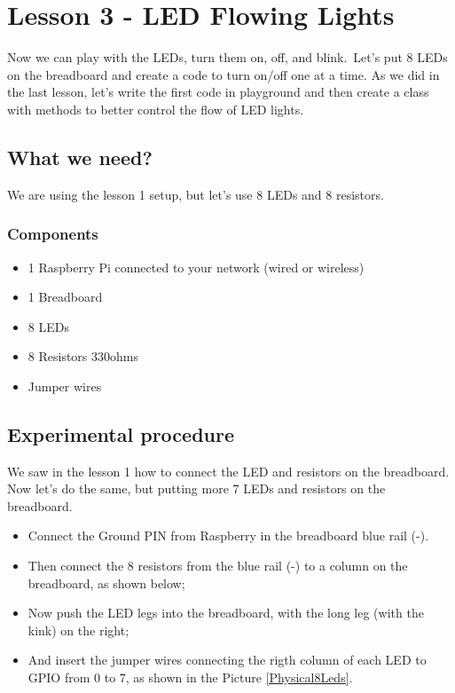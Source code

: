 \documentclass[10pt,twoside,english]{_support/latex/sbabook/sbabook}
\begin{document}
\frontmatter
\pagestyle{plain}

\tableofcontents*
\clearpage\listoffigures

\mainmatter

\chapter{Lesson 3 - LED Flowing Lights}
Now we can play with the LEDs, turn them on, off, and blink. Let's put 8 LEDs on the breadboard and create a code to turn on/off one at a time. As we did in the last lesson, let's write the first code in playground and then create a class with methods to better control the flow of LED lights.
\section{What we need?}
We are using the lesson 1 setup, but let's use 8 LEDs and 8 resistors.
\subsection{Components}
\begin{itemize}
\item 1 Raspberry Pi connected to your network (wired or wireless)
\item 1 Breadboard
\item 8 LEDs
\item 8 Resistors 330ohms
\item Jumper wires
\end{itemize}
\section{Experimental procedure}
We saw in the lesson 1 how to connect the LED and resistors on the breadboard. Now let's do the same, but putting more 7 LEDs and resistors on the breadboard.

\begin{itemize}
\item Connect the Ground PIN from Raspberry in the breadboard blue rail (-). 
\item Then connect the 8 resistors from the blue rail (-) to a column on the breadboard, as shown below;
\item Now push the LED legs into the breadboard, with the long leg (with the kink) on the right;
\item And insert the jumper wires connecting the rigth column of each LED to GPIO from 0 to 7, as shown in the Picture \ref{Physical8Leds}.
\end{itemize}
\end{document}
